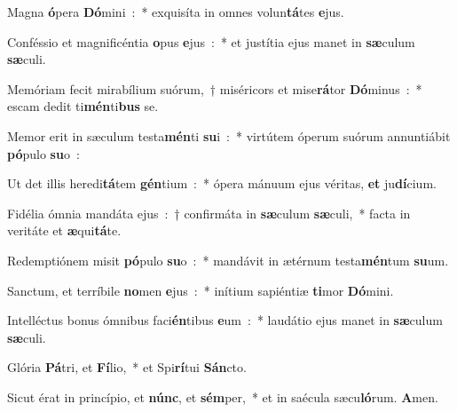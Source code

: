 ﻿\item Magna \textbf{ó}pera \textbf{Dó}mini~:~* exquisíta in omnes vo\-lun\-\textbf{tá}\-tes \textbf{e}jus.
\item Conféssio et magnificéntia \textbf{o}pus \textbf{e}jus~:~* et justítia ejus manet in \textbf{sæ}culum \textbf{sæ}culi.
\item Memóriam fecit mirabílium suórum,~† miséricors et mise\textbf{rá}tor \textbf{Dó}minus~:~* escam dedit ti\textbf{mén}ti\textbf{bus} se.
\item Memor erit in sæculum testa\textbf{mén}ti \textbf{su}i~:~* virtútem óperum suórum annuntiábit \textbf{pó}pulo \textbf{su}o~:
\item Ut det illis heredi\textbf{tá}tem \textbf{gén}tium~:~* ópera mánuum ejus véritas, \textbf{et} ju\textbf{dí}cium.
\item Fidélia ómnia mandáta ejus~:~† confirmáta in \textbf{sæ}\-cu\-lum \textbf{sæ}culi,~* facta in veritáte et \textbf{æ}qui\textbf{tá}te.
\item Redemptiónem misit \textbf{pó}pulo \textbf{su}o~:~* mandávit in ætérnum testa\textbf{mén}tum \textbf{su}um.
\item Sanctum, et terríbile \textbf{no}men \textbf{e}jus~:~* inítium sapiéntiæ \textbf{ti}mor \textbf{Dó}mini.
\item Intelléctus bonus ómnibus faci\textbf{én}tibus \textbf{e}um~:~* laudátio ejus manet in \textbf{sæ}culum \textbf{sæ}culi.
\item Glória \textbf{Pá}tri, et \textbf{Fí}lio,~* et Spi\textbf{rí}tui \textbf{Sán}cto.
\item Sicut érat in princípio, et \textbf{núnc}, et \textbf{sém}per,~* et in saécula sæcu\textbf{ló}rum. \textbf{A}men.